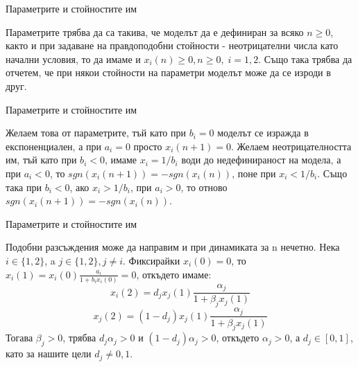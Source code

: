 
\begin{frame}[t]{Параметрите и стойностите им}

Параметрите трябва да са такива, че моделът да е дефиниран за всяко $n \geq 0$, както и при задаване на правдоподобни стойности - неотрицателни числа като начални условия, то да имаме и $x_{i}(n) \geq 0, n \geq 0, \; i=1,2$. Също така трябва да отчетем, че при някои стойности на параметри моделът може да се изроди в друг.

\end{frame}


\begin{frame}[t]{Параметрите и стойностите им}

Желаем това от параметрите, тъй като при $b_{i}=0$ моделът се изражда в експоненциален, а при $a_{i}=0$ просто $x_{i}(n+1)=0$. Желаем неотрицателността им, тъй като при $b_{i} < 0$, имаме $x_{i} = 1/b_{i}$ води до недефинираност на модела, а при $a_{i} < 0 $, то $sgn(x_{i}(n+1)) = - sgn(x_{i}(n))$, поне при $x_{i} < 1/b_{i}$. Също така при $b_{i} < 0$, ако $x_{i} > 1/b_{i}$, при $a_{i} > 0 $, то отново $sgn(x_{i}(n+1)) = - sgn(x_{i}(n))$.

\end{frame}


\begin{frame}[t]{Параметрите и стойностите им}

Подобни разсъждения може да направим и при динамиката за n нечетно. Нека $i \in \{1, 2\}$, a $j \in \{1, 2\}, j \neq i$. Фиксирайки $x_{i}(0)=0$, то $x_{i}(1)=x_{i}(0)\frac{a_{i}}{1+b_{i} x_{i}(0)}=0$, откъдето имаме:
\[x_{i}(2)=d_{j} x_{j}(1)\frac{\alpha_{j}}{1+\beta_{j} x_{j}(1)}\]
\[x_{j}(2)=(1-d_{j}) x_{j}(1)\frac{\alpha_{j}}{1+\beta_{j} x_{j}(1)}\] Тогава $\beta_{j} > 0$, трябва $d_{j}\alpha_{j}>0$ и $(1-d_{j})\alpha_{j}>0$, откъдето $\alpha_{j}>0$, а $d_{j} \in [0,1]$, като за нашите цели $d_{j} \neq 0, 1$.

\end{frame}
